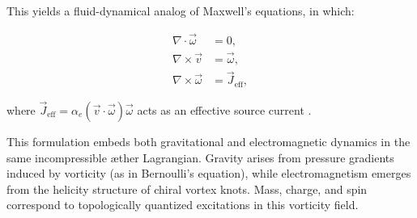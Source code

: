 This yields a fluid-dynamical analog of Maxwell's equations, in which:

\begin{align}
\nabla \cdot \vec{\omega} &= 0, \label{eq:divB} \\
\nabla \times \vec{v} &= \vec{\omega}, \label{eq:curlE} \\
\nabla \times \vec{\omega} &= \vec{J}_\text{eff}, \label{eq:ampere}
\end{align}

where $\vec{J}_\text{eff} = \alpha_e (\vec{v} \cdot \vec{\omega}) \vec{\omega}$ acts as an effective source current \cite{yakovenko2021fluid, finn2020helicity}.

\vspace{1em}
\noindent
This formulation embeds both gravitational and electromagnetic dynamics in the same incompressible æther Lagrangian. Gravity arises from pressure gradients induced by vorticity (as in Bernoulli's equation), while electromagnetism emerges from the helicity structure of chiral vortex knots. Mass, charge, and spin correspond to topologically quantized excitations in this vorticity field.



